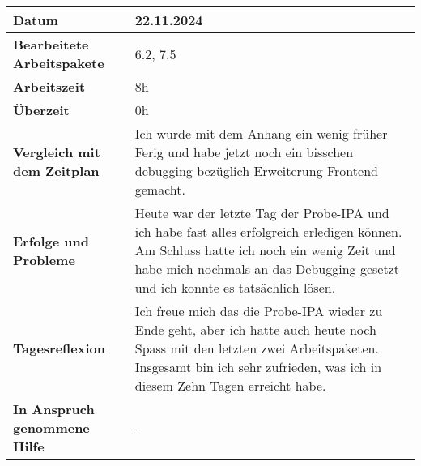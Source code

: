 \begin{longtable}{p{}|p{}}
	\hline
	\textbf{Datum}                       & 22.11.2024            \\
	\hline
	\textbf{Bearbeitete Arbeitspakete}   & 6.2, 7.5                  \\
	\hline
	\textbf{Arbeitszeit}                 & 8h                                    \\
	\hline
	\textbf{Überzeit}                    & 0h                                    \\
	\hline
	\textbf{Vergleich mit dem Zeitplan}  & Ich wurde mit dem Anhang ein wenig früher Ferig und habe jetzt noch ein bisschen debugging bezüglich Erweiterung Frontend gemacht.  \\
	\hline
	\textbf{Erfolge und Probleme} & Heute war der letzte Tag der Probe-IPA und ich habe fast alles erfolgreich erledigen können. Am Schluss hatte ich noch ein wenig Zeit und habe mich nochmals an das Debugging gesetzt und ich konnte es tatsächlich lösen.
	\\
	\hline
	\textbf{Tagesreflexion} & Ich freue mich das die Probe-IPA wieder zu Ende geht, aber ich hatte auch heute noch Spass mit den letzten zwei Arbeitspaketen. Insgesamt bin ich sehr zufrieden, was ich in diesem Zehn Tagen erreicht habe.
	\\
	\hline
	\textbf{In Anspruch genommene Hilfe} & -                              \\
	\hline
\end{longtable}\label{tab:arbeitsprotokoll-22.11.2024}
\newpage
